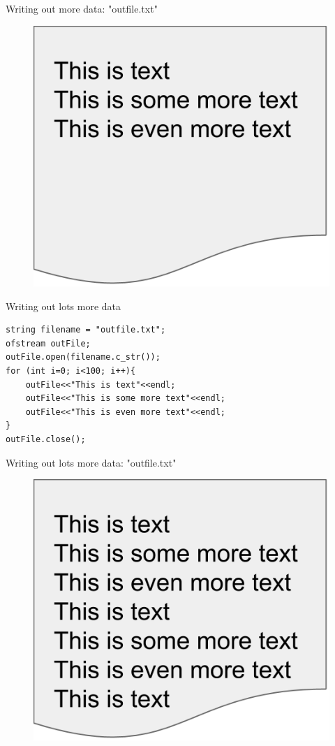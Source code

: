 \documentclass[xcolor={dvipsnames}]{beamer}
\begin{document}
\begin{frame}{Writing out more data: "outfile.txt"}
	\begin{figure}
		\includegraphics[width=.8\textwidth]{out2}
	\end{figure}
\end{frame}


\begin{frame}[fragile]{Writing out lots more data}
\begin{verbatim}
string filename = "outfile.txt";
ofstream outFile;
outFile.open(filename.c_str());
for (int i=0; i<100; i++){
    outFile<<"This is text"<<endl;
    outFile<<"This is some more text"<<endl;
    outFile<<"This is even more text"<<endl;
}
outFile.close();
\end{verbatim}
\end{frame}

\begin{frame}{Writing out lots more data: "outfile.txt"}
	\begin{figure}
		\includegraphics[width=.8\textwidth]{out3}
	\end{figure}
\end{frame}
\end{document}
